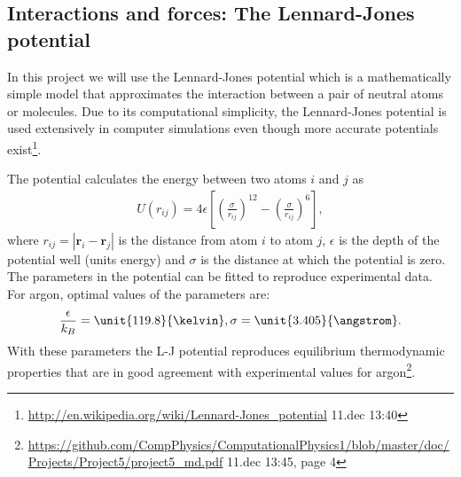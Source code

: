 \documentclass[11pt,a4wide]{article}
\renewcommand{\vec}{\mathbf}
\begin{document}
\subsection{Interactions and forces: The Lennard-Jones potential} \label{sec: L-Jpot_forces}

In this project we will use the Lennard-Jones potential which is a mathematically simple model that approximates the interaction between a pair of neutral atoms or molecules. Due to its computational simplicity, the Lennard-Jones potential is used extensively in computer simulations even though more accurate potentials exist\footnote{\url{http://en.wikipedia.org/wiki/Lennard-Jones\_potential} 11.dec 13:40}.

The potential calculates the energy between two atoms $i$ and $j$ as
\begin{align}
	U(r_{ij}) = 4\epsilon\left[\left(\frac{\sigma}{r_{ij}}\right)^{12} - \left(\frac{\sigma}{r_{ij}}\right)^6\right],
\end{align}
where $r_{ij} = |\vec r_i - \vec r_j|$ is the distance from atom $i$ to atom $j$, $\epsilon$ is the depth of the potential well (units energy) and $\sigma$ is the distance at which the potential is zero. The parameters in the potential can be fitted to reproduce experimental data. For argon, optimal values of the parameters are:
\begin{align}
	\frac{\epsilon}{k_B} = \unit{119.8}{\kelvin}, \sigma=\unit{3.405}{\angstrom}.
\end{align}
With these parameters the L-J potential reproduces equilibrium thermodynamic properties that are in good agreement with experimental values for argon\footnote{\url{https://github.com/CompPhysics/ComputationalPhysics1/blob/master/doc/Projects/Project5/project5\_md.pdf} 11.dec 13:45, page 4}.
\end{document}
